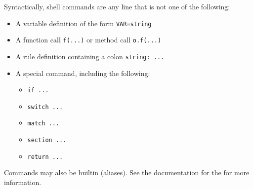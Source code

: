 Syntactically, shell commands are any line that is not one of the following:

\begin{itemize}
\item A variable definition of the form \verb+VAR=string+
\item A function call \verb+f(...)+ or method call \verb+o.f(...)+
\item A rule definition containing a colon \verb+string: ...+
\item A special command, including the following:
\begin{itemize}
\item \verb+if ...+
\item \verb+switch ...+
\item \verb+match ...+
\item \verb+section ...+
\item \verb+return ...+
\end{itemize}
\end{itemize}

Commands may also be builtin (aliases).  See the documentation for the
 for more information.

